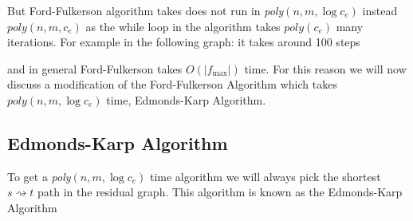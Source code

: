 But Ford-Fulkerson algorithm takes does not run in \textit{poly}$(n,m,\log c_e)$ instead $\textit{poly}(n,m,c_e)$ as the while loop in the algorithm takes $\textit{poly}(c_e)$ many iterations. For example in the following graph: it takes around 100 steps
\begin{center}
\end{center}
and in general  Ford-Fulkerson takes $O(|f_{\max}|)$ time. For this reason we will now discuss a modification of the Ford-Fulkerson Algorithm which takes $\textit{poly}(n,m,\log c_e)$ time, Edmonds-Karp Algorithm. 
\subsection{Edmonds-Karp Algorithm}
To get a \textit{poly}$(n,m,\log c_e)$ time algorithm  we will always pick the shortest $s\rightsquigarrow t$  path in the residual graph. This algorithm is known as the Edmonds-Karp Algorithm


